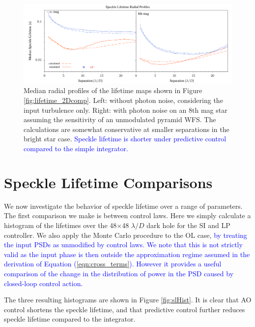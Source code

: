 \documentclass[10pt,preprint]{aastex631}
\newcommand{\jrmadd}[1]{\textcolor{blue}{#1}}
\begin{document}
\begin{figure}
\hspace{-0.3in}
\includegraphics[width=6.5in]{lifetimesRP.pdf}
\caption{Median radial profiles of the lifetime maps shown in Figure \ref{fig:lifetime_2Dcomp}.  Left: without photon noise, considering the input turbulence only.  Right: with photon noise on an 8th mag star assuming the sensitivity of an unmodulated pyramid WFS. The calculations are somewhat conservative at smaller separations in the bright star case. \jrmadd{Speckle lifetime is shorter under predictive control compared to the simple integrator.} \label{fig:lifetime_radprof}}
\end{figure}

\clearpage

\section{Speckle Lifetime Comparisons}
\label{sec:trends}

We now investigate the behavior of speckle lifetime over a range of parameters.  The first comparison we make is between control laws.  Here we simply calculate a histogram of the lifetimes over the 48$\times$48 $\lambda/D$ dark hole for the SI and LP controller.  We also apply the Monte Carlo procedure to the OL case, \jrmadd{by treating the input PSDs as unmodified by control laws.  We note that this is not strictly valid as the input phase is then outside the approximation regime assumed in the derivation of Equation (\ref{eqn:cross_terms}).  However it provides a useful comparison of the change in the distribution of power in the PSD caused by closed-loop control action. }

The three resulting histograms are shown in Figure \ref{fig:slHist}.  It is clear that AO control shortens the speckle lifetime, and that predictive control further reduces speckle lifetime compared to the integrator.
\end{document}
